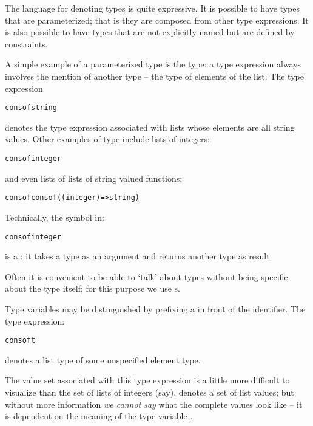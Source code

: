The language for denoting types is quite expressive. It is possible to have types that are parameterized; that is they are composed from other type expressions. It is also possible to have types that are not explicitly named but are defined by constraints.

A simple example of a parameterized type is the  type: a  type expression always involves the mention of another type -- the type of elements of the list. The type expression
\begin{alltt}
cons of string
\end{alltt}
denotes the type expression associated with lists whose elements are all string values. Other examples of  type include lists of integers:
\begin{alltt}
cons of integer
\end{alltt}
and even lists of lists of string valued functions:
\begin{alltt}
cons of cons of ((integer)=>string)
\end{alltt}
\noindent\begin{aside}
Technically, the  symbol in:
\begin{alltt}
cons of integer
\end{alltt}
is a : it takes a type as an argument and returns another type as result.
\end{aside}
Often it is convenient to be able to `talk' about types without being specific about the type itself; for this purpose we use s.

Type variables may be distinguished by prefixing a \q{\pcent{}} in front of the identifier. The type expression:
\begin{alltt}
cons of \pcent{}t
\end{alltt}
denotes a list type of some unspecified element type.

\begin{aside}
The value set associated with this type expression is a little more difficult to visualize than the set of lists of integers (say).  denotes a set of list values; but without more information \emph{we cannot say} what the complete values look like -- it is dependent on the meaning of the type variable .
\end{aside}

